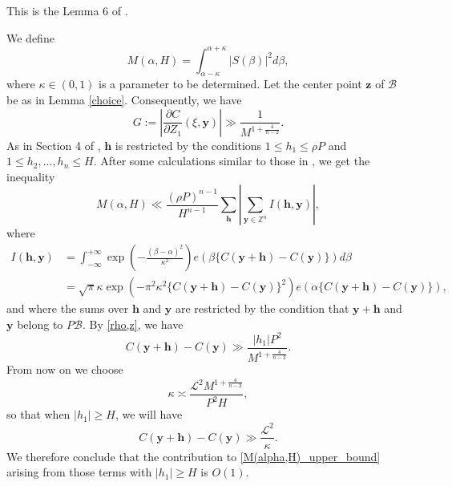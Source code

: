 \documentclass[12pt]{amsart}
\theoremstyle{definition}
\numberwithin{equation}{section}
\begin{document}
This is the Lemma 6 of \cite{browning2009least}.

We define
\begin{equation*}
    M(\alpha,H)=\int_{\alpha-\kappa}^{\alpha+\kappa} |S(\beta)|^2 d\beta,
\end{equation*}
where $\kappa \in (0,1)$ is a parameter to be determined. Let the center point $\boldsymbol{z}$ of $\mathscr{B}$ be as in Lemma \ref{choice}.  Consequently, we have
\begin{equation*}
    G :=\left|\frac{\partial C}{\partial Z_1}(\xi, \boldsymbol{y})\right| \gg \frac{1}{M^{1+\frac{4}{n-2}}}.
\end{equation*}
As in Section 4 of \cite{heath2007cubic}, $\boldsymbol{h}$ is restricted by the conditions $1 \leq h_1 \leq \rho P$ and $1 \leq h_2,...,h_n \leq H.$ After some calculations similar to those in \cite{heath2007cubic} , we get the inequality
\begin{equation}
    \label{M(alpha,H)_upper_bound}
    M(\alpha,H)\ll \frac{(\rho P)^{n-1}}{H^{n-1}} \sum_{\boldsymbol{h}} \left|\sum_{\boldsymbol{y}\in \mathbb{Z}^{n}} I(\boldsymbol{h}, \boldsymbol{y}) \right|,
\end{equation}
where
\begin{equation}
    \label{I(h,y)_definition}
    \begin{split}
    I(\boldsymbol{h}, \boldsymbol{y})
    &=\int_{-\infty}^{+\infty} \exp\left(-\frac{(\beta-\alpha)^2}{\kappa^2}\right)e\left(\beta\{ C(\boldsymbol{y}+\boldsymbol{h})-C(\boldsymbol{y})\}\right)d\beta\\
    &=\sqrt{\pi}\kappa \exp\left(-\pi^2\kappa^2\{ C(\boldsymbol{y}+\boldsymbol{h})-C(\boldsymbol{y})\}^2\right)e\left(\alpha\{ C(\boldsymbol{y}+\boldsymbol{h})-C(\boldsymbol{y})\}\right),
    \end{split}    
\end{equation}
and where the sums over $\boldsymbol{h}$ and $\boldsymbol{y}$ are restricted by the condition that $\boldsymbol{y}+\boldsymbol{h}$ and $\boldsymbol{y}$ belong to $P\mathscr{B}.$ By \eqref{rho,z}, we have
\begin{equation*}
    C(\boldsymbol{y}+\boldsymbol{h})-C(\boldsymbol{y}) \gg \frac{|h_1|P^2}{M^{1+\frac{4}{n-2}}}.
\end{equation*}
From now on we choose 
\begin{equation*}
    \kappa \asymp \frac{\mathcal{L}^2M^{1+\frac{4}{n-2}}}{P^2H},
\end{equation*}
so that when $|h_1| \geq H$, we will have
\begin{equation*}
    C(\boldsymbol{y}+\boldsymbol{h})-C(\boldsymbol{y}) \gg \frac{\mathcal{L}^2}{\kappa}.
\end{equation*}
We therefore conclude that the contribution to \eqref{M(alpha,H)_upper_bound} arising from those terms with $|h_1| \geq H$ is $O (1)$.
\end{document}
